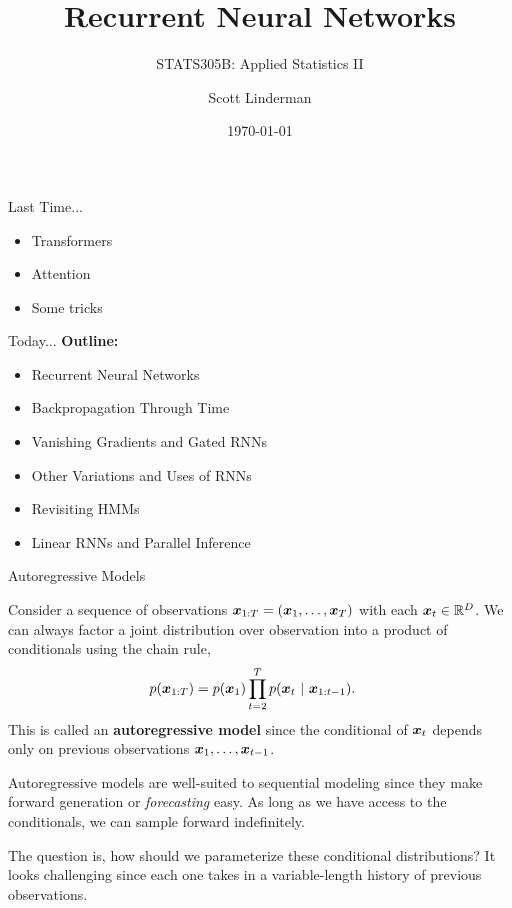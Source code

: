 \documentclass[aspectratio=169]{beamer}
\title{Recurrent Neural Networks}
\subtitle{STATS305B: Applied  Statistics II}
\author{Scott Linderman}
\date{\today}
\begin{document}
\maketitle

\begin{frame}{Last Time...}
    \begin{itemize}
        \item Transformers
        \item Attention
        \item Some tricks
    \end{itemize}
\end{frame}

\begin{frame}{Today...}
    \textbf{Outline:}
    \begin{itemize}
        \item Recurrent Neural Networks
        \item Backpropagation Through Time
        \item Vanishing Gradients and Gated RNNs
        \item Other Variations and Uses of RNNs
        \item Revisiting HMMs
        \item Linear RNNs and Parallel Inference
    \end{itemize}
    \vspace{1em}
\end{frame}



\begin{frame}[t,allowframebreaks]{Autoregressive Models}\label{autoregressive-models}

Consider a sequence of observations
\(\boldsymbol{x}_{1:T} = (\boldsymbol{x}_1, \ldots, \boldsymbol{x}_T)\) with each
\(\boldsymbol{x}_t \in \mathbb{R}^D\). We can always factor a joint distribution over
observation into a product of conditionals using the chain rule,
\begin{align*}
p(\boldsymbol{x}_{1:T}) &= p(\boldsymbol{x}_1) \prod_{t=2}^T p(\boldsymbol{x}_t ~\vert~ \boldsymbol{x}_{1:t-1}).
\end{align*} This is called an \textbf{autoregressive model} since the
conditional of \(\boldsymbol{x}_t\) depends only on previous observations
\(\boldsymbol{x}_{1}, \ldots, \boldsymbol{x}_{t-1}\).

Autoregressive models are well-suited to sequential modeling since they
make forward generation or \emph{forecasting} easy. As long as we have
access to the conditionals, we can sample forward indefinitely.

The question is, how should we parameterize these conditional
distributions? It looks challenging since each one takes in a
variable-length history of previous observations.

\end{frame}
\end{document}
